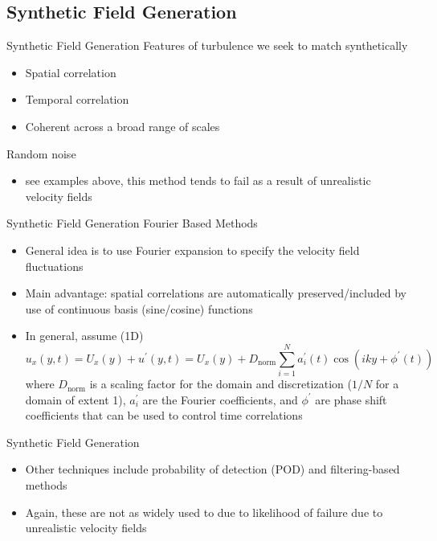 \subsection{Synthetic Field Generation}
\begin{frame}{Synthetic Field Generation}
	Features of turbulence we seek to match synthetically
	\begin{itemize}
	\item Spatial correlation
	\item Temporal correlation
	\item Coherent across a broad range of scales
	\end{itemize}
	Random noise
	\begin{itemize}
	\item see examples above, this method tends to fail as a result of unrealistic velocity fields
	\end{itemize}
\end{frame}
\begin{frame}{Synthetic Field Generation}
	Fourier Based Methods
	\begin{itemize}
	\item General idea is to use Fourier expansion to specify the velocity field fluctuations
	\item Main advantage: spatial correlations are automatically preserved/included by use of continuous basis (sine/cosine) functions
	\item In general, assume (1D)
	$$u_x(y,t) = U_x(y) + u^\prime(y,t) = U_x(y) + D_{\text{norm}} \sum^N_{i=1} a_i^\prime (t) \cos(iky+\phi^\prime(t))$$
	where $D_{\text{norm}}$ is a scaling factor for the domain and discretization ($1/N$ for a domain of extent 1), $a_i^\prime$ are the Fourier coefficients, and $\phi^\prime$ are phase shift coefficients that can be used to control time correlations
	\end{itemize}
\end{frame}
\begin{frame}{Synthetic Field Generation}
	\begin{itemize}
	\item Other techniques include probability of detection (POD) and filtering-based methods
	\item Again, these are not as widely used to due to likelihood of failure due to unrealistic velocity fields
	\end{itemize}
\end{frame}



